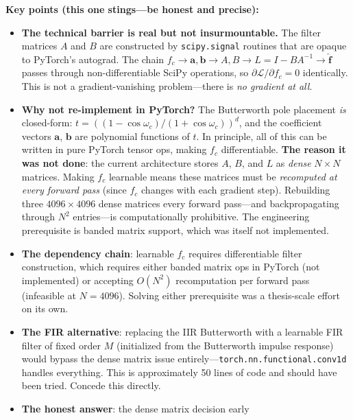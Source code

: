 \documentclass[11pt, letterpaper]{article}
\begin{document}
\begin{answerbox}
\textbf{Key points (this one stings---be honest and precise):}
\begin{itemize}[nosep]
  \item \textbf{The technical barrier is real but not insurmountable.}
        The filter matrices $A$ and $B$ are constructed by
        \texttt{scipy.signal} routines that are opaque to PyTorch's
        autograd.  The chain $f_c \to \mathbf{a}, \mathbf{b} \to
        A, B \to L = I - BA^{-1} \to \hat{\mathbf{f}}$ passes
        through non-differentiable SciPy operations, so
        $\partial\mathcal{L}/\partial f_c = 0$ identically.  This is
        not a gradient-vanishing problem---there is \emph{no gradient
        at all}.
  \item \textbf{Why not re-implement in PyTorch?}  The Butterworth
        pole placement \emph{is} closed-form:
        $t = ((1-\cos\omega_c)/(1+\cos\omega_c))^d$, and the
        coefficient vectors $\mathbf{a}$, $\mathbf{b}$ are polynomial
        functions of $t$.  In principle, all of this can be written in
        pure PyTorch tensor ops, making $f_c$ differentiable.
        \textbf{The reason it was not done}: the current architecture
        stores $A$, $B$, and $L$ as \emph{dense} $N \times N$ matrices.
        Making $f_c$ learnable means these matrices must be
        \emph{recomputed at every forward pass} (since $f_c$ changes
        with each gradient step).  Rebuilding three $4096 \times 4096$
        dense matrices every forward pass---and backpropagating through
        $N^2$ entries---is computationally prohibitive.  The
        engineering prerequisite is banded matrix support, which was
        itself not implemented.
  \item \textbf{The dependency chain}: learnable $f_c$ requires
        differentiable filter construction, which requires either
        banded matrix ops in PyTorch (not implemented) or accepting
        $O(N^2)$ recomputation per forward pass (infeasible at
        $N{=}4096$).  Solving either prerequisite was a thesis-scale
        effort on its own.
  \item \textbf{The FIR alternative}: replacing the IIR Butterworth
        with a learnable FIR filter of fixed order $M$ (initialized
        from the Butterworth impulse response) would bypass the dense
        matrix issue entirely---\texttt{torch.nn.functional.conv1d}
        handles everything.  This is approximately 50 lines of code
        and should have been tried.  Concede this directly.
  \item \textbf{The honest answer}: the dense matrix decision early

\end{itemize}
\end{answerbox}
\end{document}
